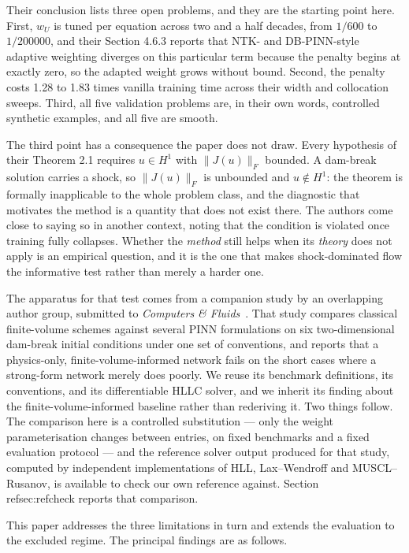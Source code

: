 \documentclass[11pt]{article}
\newcommand{\wU}{w_U}
\begin{document}
Their conclusion lists three open problems, and they are the starting point
here. First, $\wU$ is tuned per equation across two and a half decades, from
$1/600$ to $1/200000$, and their Section 4.6.3 reports that NTK- and
DB-PINN-style adaptive weighting diverges on this particular term because the
penalty begins at exactly zero, so the adapted weight grows without bound.
Second, the penalty costs 1.28 to 1.83 times vanilla training time across their
width and collocation sweeps. Third, all five validation problems are, in their
own words, controlled synthetic examples, and all five are smooth.

The third point has a consequence the paper does not draw. Every hypothesis of
their Theorem 2.1 requires $u \in H^1$ with $\|J(u)\|_F$ bounded. A dam-break
solution carries a shock, so $\|J(u)\|_F$ is unbounded and $u \notin H^1$: the
theorem is formally inapplicable to the whole problem class, and the diagnostic
that motivates the method is a quantity that does not exist there. The authors
come close to saying so in another context, noting that the condition is
violated once training fully collapses. Whether the \emph{method} still helps when
its \emph{theory} does not apply is an empirical question, and it is the one that
makes shock-dominated flow the informative test rather than merely a harder one.

The apparatus for that test comes from a companion study by an overlapping
author group, submitted to \emph{Computers \& Fluids}~\cite{dambreak2026comparative}.
That study compares classical finite-volume schemes against several PINN
formulations on six two-dimensional dam-break initial conditions under one set
of conventions, and reports that a physics-only, finite-volume-informed network
fails on the short cases where a strong-form network merely does poorly. We
reuse its benchmark definitions, its conventions, and its differentiable HLLC
solver, and we inherit its finding about the finite-volume-informed baseline
rather than rederiving it. Two things follow. The comparison here is a
controlled substitution --- only the weight parameterisation changes between
entries, on fixed benchmarks and a fixed evaluation protocol --- and the
reference solver output produced for that study, computed by independent
implementations of HLL, Lax--Wendroff and MUSCL--Rusanov, is available to check
our own reference against. Section~\\ref{sec:refcheck} reports that comparison.

This paper addresses the three limitations in turn and extends the evaluation
to the excluded regime. The principal findings are as follows.
\end{document}
